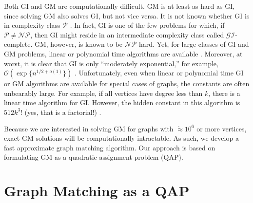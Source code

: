 \documentclass[11pt]{article}
\providecommand{\mc}[1]{\mathcal{#1}}
\newcommand{\Real}{\mathbb{R}}
\begin{document}
Both GI and GM are computationally difficult. GM is at least as hard as GI, since solving GM also solves GI, but not vice versa. It is not known whether GI is in complexity class $\mc{P}$ \cite{Fortin1996}.  In fact, GI is one of the few problems for which, if $\mc{P} \neq \mc{NP}$, then GI might reside in an intermediate complexity class called $\mc{GI}$-complete.  GM, however, is known to be $\mc{NP}$-hard.    
Yet, for large classes of GI and GM problems, linear or polynomial time algorithms are available \cite{Babai1980}.  Moreover, at worst, it is clear that GI is only ``moderately exponential,'' for example, $\mc{O}(\exp\{n^{1/2 + o(1)}\})$ \cite{Babai1981}.  Unfortunately, even when linear or polynomial time GI or GM algorithms are available for special cases of graphs, the constants are often unbearably large.  For example, if all vertices have degree less than $k$, there is a linear time algorithm for GI.  However, the hidden constant in this algorithm is $512k^3!$ (yes, that is a factorial!) \cite{Chen1994}.  

Because we are interested in solving GM for graphs with $\dot{\approx} 10^6$ or more vertices, exact GM solutions will be computationally intractable. As such, we develop a fast approximate graph matching algorithm.   Our approach is based on formulating GM as a quadratic assignment problem (QAP).  %



\section{Graph  Matching as a QAP} %
\label{sec:QAP}

% 
\end{document}
